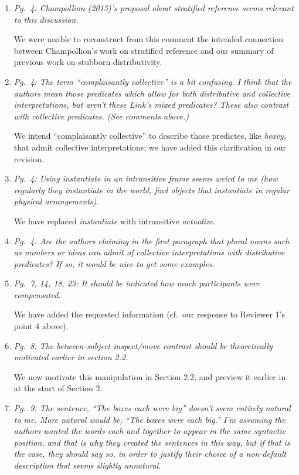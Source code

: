 \documentclass[12pt]{article}
\begin{document}
\begin{enumerate}
\item \emph{Pg.~4: Champollion (2015)'s proposal about stratified reference seems relevant to this discussion.}

We were unable to reconstruct from this comment the intended connection between Champollion's work on stratified reference and our summary of previous work on stubborn distributivity.

\item \emph{Pg.~4: The term ``complaisantly collective'' is a bit confusing. I think that the authors mean those predicates which allow for both distributive and collective interpretations, but aren't these Link's mixed predicates? These also contrast with collective predicates. (See comments above.)}

We intend ``complaisantly collective'' to describe those predictes, like \emph{heavy}, that admit collective interpretations; we have added this clarification in our revision.

\item \emph{Pg.~4: Using \emph{instantiate} in an intransitive frame seems weird to me (\emph{how regularly they instantiate in the world}, \emph{find objects that instantiate in regular physical arrangements}).}

We have replaced \emph{instantiate} with intransitive \emph{actualize}.
	
\item \emph{Pg.~4: Are the authors claiming in the first paragraph that plural nouns such as \emph{numbers} or \emph{ideas} can admit of collective interpretations with distributive predicates? If so, it would be nice to get some examples.}

\item \emph{Pg.~7, 14, 18, 23: It should be indicated how much participants were compensated.}

We have added the requested information (cf.~our response to Reviewer 1's point 4 above).

\item \emph{Pg.~8: The between-subject inspect/move contrast should be theoretically motivated earlier in section 2.2.}

We now motivate this manipulation in Section 2.2, and preview it earlier in at the start of Section 2.

\item \emph{Pg.~9: The sentence, ``The boxes each were big'' doesn't seem entirely natural to me. More natural would be, ``The boxes were each big.'' I'm assuming the authors wanted the words each and together to appear in the same syntactic position, and that is why they created the sentences in this way, but if that is the case, they should say so, in order to justify their choice of a non-default description that seems slightly unnatural.}


\end{enumerate}
\end{document}
